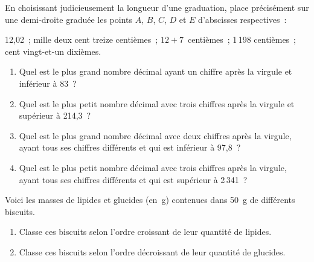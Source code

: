 \begin{exercice}[À placer]
En choisissant judicieusement la longueur d'une graduation, place précisément sur une demi‑droite graduée les points $A$, $B$, $C$, $D$ et $E$ d'abscisses respectives : \vspace{-0.5em} %

12,02 ; mille deux cent treize centièmes ; $12 + 7$ centièmes ; 1\,198 centièmes ; cent vingt-et-un dixièmes.
\end{exercice}


\begin{exercice}[Comparaison]
\begin{enumerate}
 \item Quel est le plus grand nombre décimal ayant un chiffre après la virgule et inférieur à 83 ?
 \item Quel est le plus petit nombre décimal avec trois chiffres après la virgule et supérieur à 214,3 ?
 \item Quel est le plus grand nombre décimal avec deux chiffres après la virgule, ayant tous ses chiffres différents et qui est inférieur à 97,8 ?
 \item Quel est le plus petit nombre décimal avec trois chiffres après la virgule, ayant tous ses chiffres différents et qui est supérieur à 2\,341 ?
 \end{enumerate}
\end{exercice}


\begin{exercice} %
Voici les masses de lipides et glucides (en g) contenues dans 50 g de différents biscuits.
\begin{enumerate}
 \item Classe ces biscuits selon l'ordre croissant de leur quantité de lipides.
 \item Classe ces biscuits selon l'ordre décroissant de leur quantité de glucides.
 \end{enumerate}
\end{exercice}


